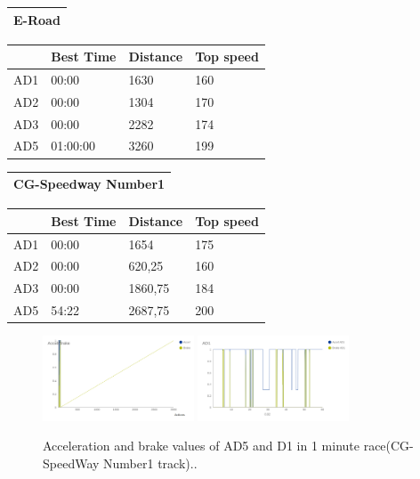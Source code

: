 \documentclass{llncs}
\begin{document}
\begin{table} [h!]
\begin{tabular}{ ||p{3cm}||p{3cm}||p{3cm}||p{3 cm}||}
	\end{tabular}
	\begin{tabular}{ |p{}|}
		\hline
		\textbf{E-Road}   
		\\
		\hline
	\end{tabular}
	\begin{tabular}{ ||p{3cm}||p{3cm}||p{3cm}||p{3 cm}||}
		\hline
		{ \color{blue}\textbf{} }&
		{ \color{red}\textbf{Best Time} }&
		{ \color{red} \textbf{Distance } } &
		{ \color{red} \textbf{Top speed} }
		\\
		\hline
		AD1 & 00:00 &1630 &  160
		\\
		\hline
		AD2 & 00:00 & 1304 & 170 
		\\
		\hline
		AD3 & 00:00  &2282& 174
		\\
		\hline 
		AD5 & 01:00:00 & 3260 & 199
		\\
		\hline 
		
	\end{tabular}
	\begin{tabular}{ |p{}|}
		\hline
		\textbf{CG-Speedway Number1}   
		\\
		\hline
	\end{tabular}
	\begin{tabular}{ ||p{3cm}||p{3cm}||p{3cm}||p{3 cm}||}
		\hline
		{ \color{blue}\textbf{} }&
		{ \color{red}\textbf{Best Time} }&
		{ \color{red} \textbf{Distance } } &
		{ \color{red} \textbf{Top speed} }
		\\
		\hline
		AD1 & 00:00 & 1654&  175
		\\
		\hline
		AD2 & 00:00  & 620,25& 160 
		\\
		\hline
		AD3 & 00:00  &1860,75&184 
		\\
		\hline 
		AD5 & 54:22& 2687,75 &200
		\\
		\hline 
		
	\end{tabular}
\end{table}
\newpage
\begin{figure}[h!]
	
	\centering
	\includegraphics[width=0.4\textwidth]{fig/AD5Accel.PNG}
	\includegraphics[width=0.4\textwidth]{fig/AD1accel.PNG}
	\begin{minipage}{10cm}
		\centering
		\caption{\footnotesize Acceleration and brake values of AD5 and D1 in 1 minute race(CG-SpeedWay Number1 track)..}
		\label{accel/brake}
	\end{minipage} 
	
\end{figure}
\end{document}
